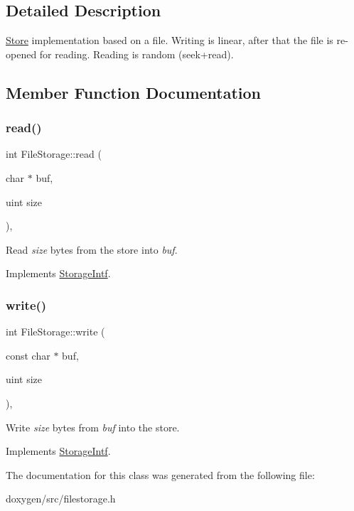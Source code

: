\subsection{Detailed Description}
\mbox{\hyperlink{class_store}{Store}} implementation based on a file. Writing is linear, after that the file is re-\/opened for reading. Reading is random (seek+read). 

\subsection{Member Function Documentation}
\mbox{\label{class_file_storage_ae28163449c4c40730b5e27b75362e22d}} 
\subsubsection{\texorpdfstring{read()}{read()}}
{\footnotesize\ttfamily int File\+Storage\+::read (\begin{DoxyParamCaption}\item[{char $\ast$}]{buf,  }\item[{uint}]{size }\end{DoxyParamCaption})\hspace{0.3cm}{\ttfamily [inline]}, {\ttfamily [virtual]}}

Read {\itshape size} bytes from the store into {\itshape buf}. 

Implements \mbox{\hyperlink{class_storage_intf_a125b99d1511364f4fe49709feec46bb4}{Storage\+Intf}}.

\mbox{\label{class_file_storage_a9f680051229bda7bca2639e5464bca77}} 
\subsubsection{\texorpdfstring{write()}{write()}}
{\footnotesize\ttfamily int File\+Storage\+::write (\begin{DoxyParamCaption}\item[{const char $\ast$}]{buf,  }\item[{uint}]{size }\end{DoxyParamCaption})\hspace{0.3cm}{\ttfamily [inline]}, {\ttfamily [virtual]}}

Write {\itshape size} bytes from {\itshape buf} into the store. 

Implements \mbox{\hyperlink{class_storage_intf_a97b26023c6cf0590423e428947d6febb}{Storage\+Intf}}.



The documentation for this class was generated from the following file\+:\begin{DoxyCompactItemize}
\item 
doxygen/src/filestorage.\+h\end{DoxyCompactItemize}
